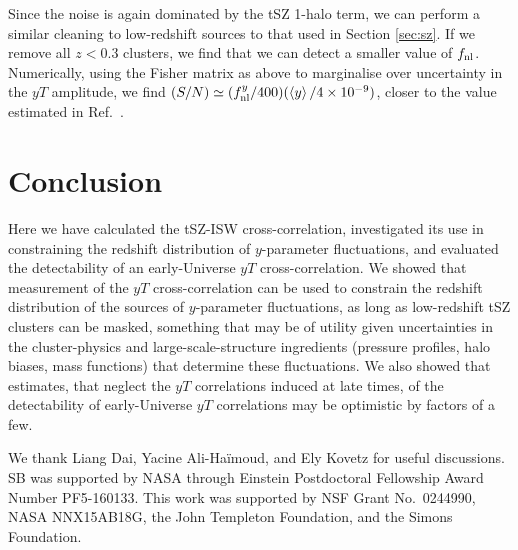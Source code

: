 \documentclass[aps,twocolumn,floats,prd,nofootinbib,10pt,floatfix]{revtex4-1}
\def\VEV#1{\left\langle #1 \right\rangle}
\begin{document}
Since the noise is again dominated by the tSZ 1-halo term, we can 
perform a similar cleaning to low-redshift sources to that used 
in Section \ref{sec:sz}. If we remove all $z<0.3$ clusters, we 
find that we can detect a smaller value of $f_{\rm nl}$. 
Numerically, using the Fisher matrix as above to marginalise 
over uncertainty in the $yT$ amplitude, we find
$(S/N) \simeq (f_{\rm nl}^y/400)( \VEV{y} / 4\times 10^{-9})$,
closer to the value estimated in Ref.~\cite{Emami:2015xqa}.

\section{Conclusion}
\label{sec:concl}

Here we have calculated the tSZ-ISW cross-correlation,
investigated its use in constraining the redshift distribution
of $y$-parameter fluctuations, and evaluated the detectability
of an early-Universe $yT$ cross-correlation.  We showed that
measurement of the $yT$ cross-correlation can be used to
constrain the redshift distribution of the sources of
$y$-parameter fluctuations, as long as low-redshift tSZ clusters
can be masked, something that may be of utility
given uncertainties in the cluster-physics and
large-scale-structure ingredients (pressure profiles, halo
biases, mass functions) that determine these fluctuations.  We
also showed that estimates, that neglect the $yT$
correlations induced at late times, of the detectability of
early-Universe $yT$ correlations may be optimistic by factors of
a few.

\begin{acknowledgments}
We thank Liang Dai, Yacine Ali-Ha\"{i}moud, and Ely
Kovetz for useful discussions.  SB was supported by NASA through
Einstein Postdoctoral Fellowship Award Number PF5-160133.  This
work was supported by NSF Grant No.\ 0244990, NASA NNX15AB18G,
the John Templeton Foundation, and the Simons Foundation.
\end{acknowledgments}
\end{document}
